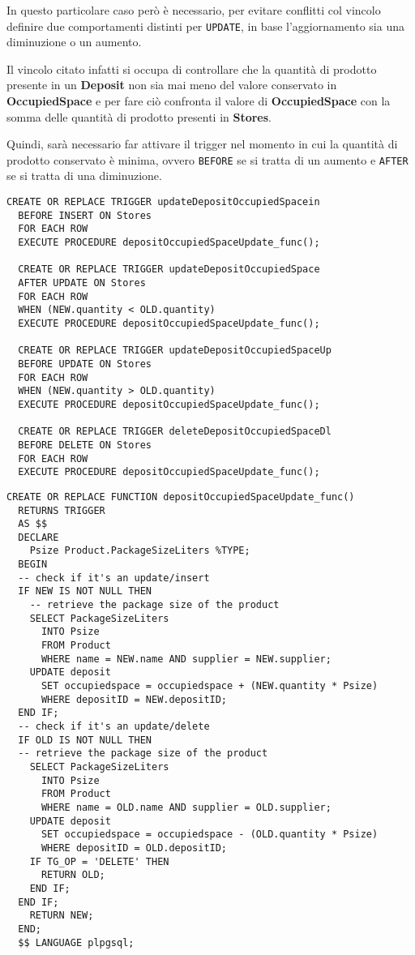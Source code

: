 In questo particolare caso però è necessario, per evitare conflitti col vincolo  definire due comportamenti distinti per \lstinline{UPDATE}, in base l'aggiornamento sia una diminuzione o un aumento.

Il vincolo citato infatti si occupa di controllare che la quantità di prodotto presente in un \textbf{Deposit} non sia mai meno del valore conservato in \textbf{OccupiedSpace} e per fare ciò confronta il valore di \textbf{OccupiedSpace} con la somma delle quantità di prodotto presenti in \textbf{Stores}.

Quindi, sarà necessario far attivare il trigger nel momento in cui la quantità di prodotto conservato è minima, ovvero \lstinline{BEFORE} se si tratta di un aumento e \lstinline{AFTER} se si tratta di una diminuzione.

\begin{lstlisting}[caption={Trigger per implementare \textbf{depositOccupiedSpaceUpdate}}]
  CREATE OR REPLACE TRIGGER updateDepositOccupiedSpacein
  BEFORE INSERT ON Stores
  FOR EACH ROW
  EXECUTE PROCEDURE depositOccupiedSpaceUpdate_func();

  CREATE OR REPLACE TRIGGER updateDepositOccupiedSpace
  AFTER UPDATE ON Stores
  FOR EACH ROW
  WHEN (NEW.quantity < OLD.quantity)
  EXECUTE PROCEDURE depositOccupiedSpaceUpdate_func();

  CREATE OR REPLACE TRIGGER updateDepositOccupiedSpaceUp
  BEFORE UPDATE ON Stores
  FOR EACH ROW
  WHEN (NEW.quantity > OLD.quantity)
  EXECUTE PROCEDURE depositOccupiedSpaceUpdate_func();

  CREATE OR REPLACE TRIGGER deleteDepositOccupiedSpaceDl
  BEFORE DELETE ON Stores
  FOR EACH ROW
  EXECUTE PROCEDURE depositOccupiedSpaceUpdate_func();
\end{lstlisting}

\begin{lstlisting}[caption={Funzione \textbf{depositOccupiedSpaceUpdate}}]
  CREATE OR REPLACE FUNCTION depositOccupiedSpaceUpdate_func()
  RETURNS TRIGGER
  AS $$
  DECLARE
    Psize Product.PackageSizeLiters %TYPE;
  BEGIN
  -- check if it's an update/insert
  IF NEW IS NOT NULL THEN
    -- retrieve the package size of the product
    SELECT PackageSizeLiters
      INTO Psize
      FROM Product
      WHERE name = NEW.name AND supplier = NEW.supplier;
    UPDATE deposit
      SET occupiedspace = occupiedspace + (NEW.quantity * Psize)
      WHERE depositID = NEW.depositID;
  END IF;
  -- check if it's an update/delete 
  IF OLD IS NOT NULL THEN
  -- retrieve the package size of the product
    SELECT PackageSizeLiters
      INTO Psize
      FROM Product
      WHERE name = OLD.name AND supplier = OLD.supplier;
    UPDATE deposit
      SET occupiedspace = occupiedspace - (OLD.quantity * Psize)
      WHERE depositID = OLD.depositID;
    IF TG_OP = 'DELETE' THEN
      RETURN OLD;
    END IF;
  END IF;
    RETURN NEW;
  END;
  $$ LANGUAGE plpgsql;
\end{lstlisting}

